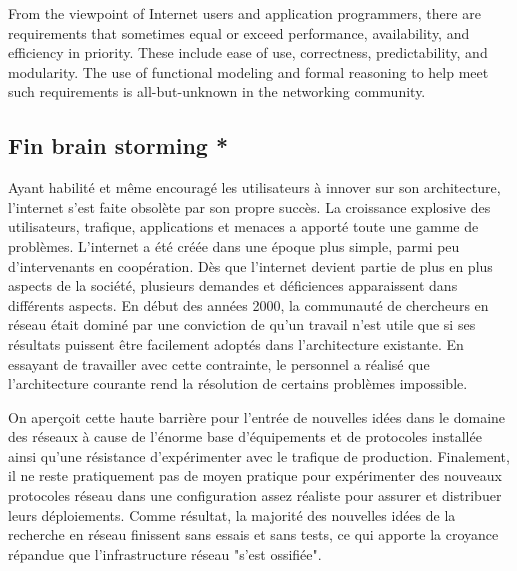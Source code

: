 From the viewpoint of Internet users and application programmers, there are requirements that sometimes equal or exceed performance, availability, and efficiency in priority. These include ease of use, correctness, predictability, and modularity. The use of functional modeling and formal reasoning to help meet such requirements is all-but-unknown in the networking community.


\subsection*{Fin brain storming *}
Ayant habilité et même encouragé les utilisateurs à innover sur son architecture, l'internet s'est faite obsolète par son propre succès. La croissance explosive des utilisateurs, trafique, applications et menaces a apporté toute une gamme de problèmes. L'internet a été créée dans une époque plus simple, parmi peu d'intervenants en coopération. Dès que l'internet devient partie de plus en plus aspects de la société, plusieurs demandes et déficiences apparaissent dans différents aspects. En début des années 2000, la communauté de chercheurs en réseau était dominé par une conviction de qu'un travail n'est utile que si ses résultats puissent être facilement adoptés dans l'architecture existante. En essayant de travailler avec cette contrainte, le personnel a réalisé que l'architecture courante rend la résolution de certains problèmes impossible. \cite{InternetEvolutionRoleSoftwareEngineering}






\par
On aperçoit cette haute barrière pour l'entrée de nouvelles idées dans le domaine des réseaux à cause de l'énorme base d'équipements et de protocoles installée ainsi qu'une résistance d'expérimenter avec le trafique de production. Finalement, il ne reste pratiquement pas de moyen pratique pour expérimenter des nouveaux protocoles réseau dans une configuration assez réaliste pour assurer et distribuer leurs déploiements. Comme résultat, la majorité des nouvelles idées de la recherche en réseau finissent sans essais et sans tests, ce qui apporte la croyance répandue que l'infrastructure réseau "s'est ossifiée". \cite{OpenFlowStanford} 




